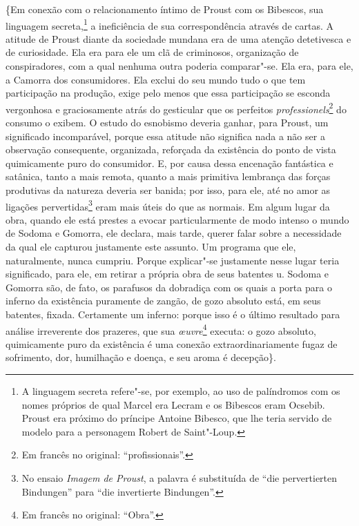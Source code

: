 \{Em conexão com o relacionamento íntimo de Proust com os Bibescos, sua
linguagem secreta,\footnote{A linguagem secreta refere"-se, por exemplo,
  ao uso de palíndromos com os nomes próprios de qual Marcel era Lecram
  e os Bibescos eram Ocsebib. Proust era próximo do príncipe Antoine
  Bibesco, que lhe teria servido de modelo para a personagem Robert de
  Saint"-Loup.} a ineficiência de sua correspondência através de cartas.
A atitude de Proust diante da sociedade mundana era de uma atenção
detetivesca e de curiosidade. Ela era para ele um clã de criminosos,
organização de conspiradores, com a qual nenhuma outra poderia
comparar"-se. Ela era, para ele, a Camorra dos consumidores. Ela exclui
do seu mundo tudo o que tem participação na produção, exige pelo menos
que essa participação se esconda vergonhosa e graciosamente atrás do
gesticular que os perfeitos \emph{professionels}\footnote{Em francês no original:
  ``profissionais''. \versal{[N. T.]}} do consumo o exibem. O estudo do esnobismo deveria
ganhar, para Proust, um significado incomparável, porque essa atitude
não significa nada a não ser a observação consequente, organizada,
reforçada da existência do ponto de vista quimicamente puro do
consumidor. E, por causa dessa encenação fantástica e satânica, tanto a
mais remota, quanto a mais primitiva lembrança das forças produtivas da
natureza deveria ser banida; por isso, para ele, até no amor as ligações
pervertidas\footnote{No ensaio \emph{Imagem de Proust}, a palavra
  é substituída de ``die pervertierten Bindungen'' para ``die
  invertierte Bindungen''. \versal{[N. E.]}} eram mais úteis do que as normais. Em algum
lugar da obra, quando ele está prestes a evocar particularmente de modo
intenso o mundo de Sodoma e Gomorra, ele declara, mais tarde, querer
falar sobre a necessidade da qual ele capturou justamente este assunto.
Um programa que ele, naturalmente, nunca cumpriu. Porque explicar"-se
justamente nesse lugar teria significado, para ele, em retirar a própria
obra de seus batentes u. Sodoma e Gomorra são, de fato, os parafusos da
dobradiça com os quais a porta para o inferno da existência puramente de
zangão, de gozo absoluto está, em seus batentes, fixada. Certamente um
inferno: porque isso é o último resultado para análise irreverente dos
prazeres, que sua \emph{œuvre}\footnote{Em francês no original:
  ``Obra''. \versal{[N. T.]}} executa: o gozo absoluto, quimicamente puro da existência é uma
conexão extraordinariamente fugaz de sofrimento, dor, humilhação e
doença, e seu aroma é decepção\}.

